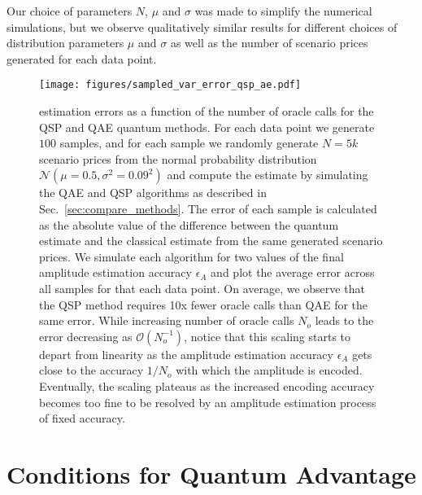 \begin{enumerate}
Our choice of parameters $N$, $\mu$ and $\sigma$ was made to simplify the numerical simulations, but we observe qualitatively similar results for different choices of distribution parameters $\mu$ and $\sigma$ as well as the number of scenario prices generated for each data point.


\begin{figure}[t]
  \centering
  \texttt{[image: figures/sampled\_var\_error\_qsp\_ae.pdf]}
  \caption{\var{} estimation errors as a function of the number of oracle calls for the QSP and QAE quantum methods. For each data point we generate $100$ samples, and for each sample we randomly generate $N=5k$ scenario prices from the normal probability distribution $\mathcal{N}(\mu=0.5, \sigma^2=0.09^2)$ and compute the \var{} estimate by simulating the QAE and QSP algorithms as described in Sec.~\ref{sec:compare_methods}. The error of each sample is calculated as the absolute value of the difference between the quantum \var{} estimate and the classical \var{} estimate from the same generated scenario prices. We simulate each algorithm for two values of the final amplitude estimation accuracy $\epsilon_A$ and plot the average error across all samples for that each data point. On average, we observe that the QSP method requires 10x fewer oracle calls than QAE for the same \var{} error.
  While increasing number of oracle calls $N_o$ leads to the \var{} error decreasing as $\mathcal{O}(N_o^{-1})$, notice that this scaling starts to depart from linearity as the amplitude estimation accuracy $\epsilon_A$ gets close to the accuracy $1/N_o$ with which the amplitude is encoded.
  Eventually, the scaling plateaus as the increased encoding accuracy becomes too fine to be resolved by an amplitude estimation process of fixed accuracy.}

  \label{fig:sampled_var_error_qsp_ae}
\end{figure}

\section{Conditions for Quantum Advantage}
\label{sec:quantum_advantage}


\end{enumerate}
